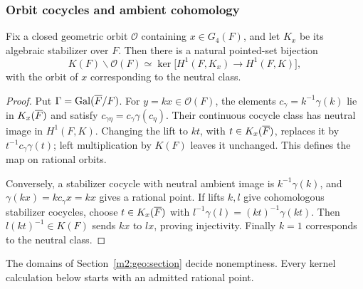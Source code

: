 \subsubsection{Orbit cocycles and ambient cohomology}

\begin{proposition}
\label{m2:rat:orbit-correspondence}
Fix a closed geometric orbit $\mathscr O$ containing
$x\in G_4(F)$, and let $K_x$ be its algebraic stabilizer over $F$.
Then there is a natural pointed-set bijection
\begin{equation}\label{m2:rat:orbit-kernel}
 K(F)\backslash\mathscr O(F)
 \simeq\ker\bigl[H^1(F,K_x)\longrightarrow H^1(F,K)\bigr],
\end{equation}
with the orbit of $x$ corresponding to the neutral class.
\end{proposition}

\begin{proof}
Put $\Gamma=\operatorname{Gal}(\overline F/F)$. For $y=kx\in\mathscr O(F)$,
the elements $c_\gamma=k^{-1}\gamma(k)$ lie in $K_x(\overline F)$
and satisfy $c_{\gamma\eta}=c_\gamma\gamma(c_\eta)$.
Their continuous cocycle class has neutral image in $H^1(F,K)$.
Changing the lift to $kt$, with $t\in K_x(\overline F)$, replaces it by
$t^{-1}c_\gamma\gamma(t)$; left multiplication by $K(F)$ leaves
it unchanged. This defines the map on rational orbits.

Conversely, a stabilizer cocycle with neutral ambient image is
$k^{-1}\gamma(k)$, and $\gamma(kx)=kc_\gamma x=kx$ gives a
rational point. If lifts $k,l$ give cohomologous stabilizer cocycles,
choose $t\in K_x(\overline F)$ with
$l^{-1}\gamma(l)=(kt)^{-1}\gamma(kt)$. Then $l(kt)^{-1}\in K(F)$
sends $kx$ to $lx$, proving injectivity. Finally $k=1$ corresponds
to the neutral class.
\end{proof}

The domains of Section~\ref{m2:geo:section} decide nonemptiness.
Every kernel calculation below starts with an admitted rational point.

